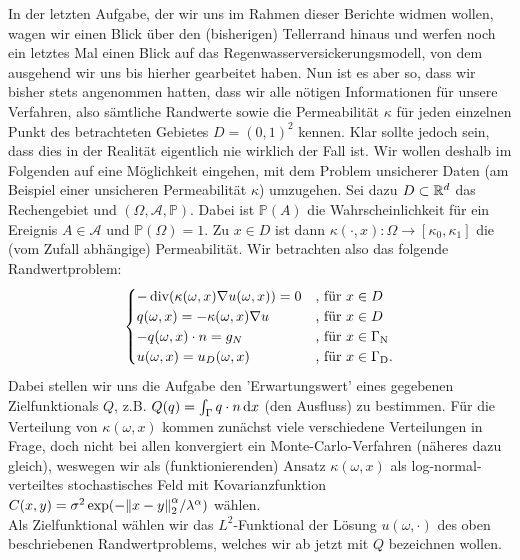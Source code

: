 In der letzten Aufgabe, der wir uns im Rahmen dieser Berichte widmen wollen, wagen wir einen Blick über den (bisherigen) Tellerrand hinaus und werfen noch ein letztes Mal einen Blick auf das Regenwasserversickerungsmodell, von dem ausgehend wir uns bis hierher gearbeitet haben. Nun ist es aber so, dass wir bisher stets angenommen hatten, dass wir alle nötigen Informationen für unsere Verfahren, also sämtliche Randwerte sowie die Permeabilität $\kappa$ für jeden einzelnen Punkt des betrachteten Gebietes $D=(0,1)^2$ kennen.
Klar sollte jedoch sein, dass dies in der Realität eigentlich nie wirklich der Fall ist. Wir wollen deshalb im Folgenden auf eine Möglichkeit eingehen, mit dem Problem unsicherer Daten (am Beispiel einer unsicheren Permeabilität $\kappa$)  umzugehen.
\newline
Sei dazu $D \subset \mathbb{R} ^d$ das Rechengebiet und $(\Omega,\mathcal{A} ,\mathbb{P})$. Dabei ist $\mathbb{P} (A)$ die Wahrscheinlichkeit für ein Ereignis $A \in \mathcal{A}$ und $\mathbb{P} (\Omega ) = 1$.
\newline
Zu $x \in D$ ist dann	$\kappa (\cdot ,x ) : \Omega \rightarrow [\kappa_0,\kappa_1] $ die (vom Zufall abhängige) Permeabilität.
Wir betrachten also das folgende Randwertproblem:
\begin{gather*}
	\begin{cases}
	- \operatorname{div}( \kappa(\omega,x)\nabla u(\omega,x))=0 &\text{, für } x \in D \\
	q(\omega , x) = - \kappa(\omega ,x) \nabla u &\text{, für }  x \in D\\
	-q(\omega,x) \cdot n = g_N &\text{, für } x \in \Gamma_{\text{N}}\\
	u(\omega,x) = u_D(\omega,x) &\text{, für } x \in \Gamma_{\text{D}}. 
	\end{cases}
\end{gather*}
Dabei stellen wir uns die Aufgabe den 'Erwartungswert' eines gegebenen Zielfunktionals $Q$, z.B. $Q(q) = \int_{\Gamma} q \cdot n \mathop{}\!\mathrm{d} x $ (den Ausfluss) zu bestimmen.
Für die Verteilung von $\kappa (\omega,x )$ kommen zunächst viele verschiedene Verteilungen in Frage, doch nicht bei allen konvergiert ein Monte-Carlo-Verfahren (näheres dazu gleich), weswegen wir als (funktionierenden) Ansatz $\kappa (\omega,x )$  als log-normal-verteiltes stochastisches Feld mit Kovarianzfunktion $C(x,y)= \sigma^2 \exp ( - \norm{x-y}^{\alpha}_2 / \lambda^{\alpha})$ wählen. \\
Als Zielfunktional wählen wir das $L^2$-Funktional der Lösung $u(\omega,\cdot)$ des oben beschriebenen Randwertproblems, welches wir ab jetzt mit $Q$ bezeichnen wollen.
